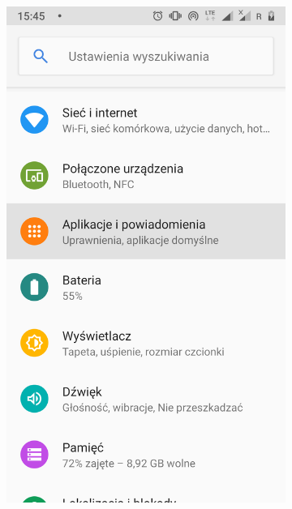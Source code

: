 \begin{enumerate}
	\begin{figure}[H]
		\centering
		\begin{subfigure}{0.35\textwidth}
			\centering
			\includegraphics[scale=0.13]{dodatekA/1_1.png}
			\subcaption{\label{subfigure_a}}
		\end{subfigure}
		\begin{subfigure}{0.35\textwidth}
			\centering

\end{subfigure}
\end{figure}
\end{enumerate}
